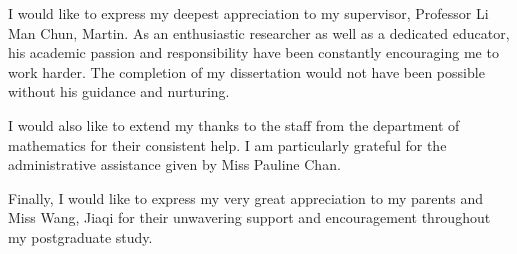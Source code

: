 I would like to express my deepest appreciation to my supervisor, Professor Li Man Chun, Martin. As an enthusiastic researcher as well as a dedicated educator, his academic passion and responsibility have been constantly encouraging me to work harder. The completion of my dissertation would not have been possible without his guidance and nurturing.

I would also like to extend my thanks to the staff from the department of mathematics for their consistent help. I am particularly grateful for the administrative assistance given by Miss Pauline Chan.

Finally, I would like to express my very great appreciation to my parents and Miss Wang, Jiaqi for their unwavering support and encouragement throughout my postgraduate study.


